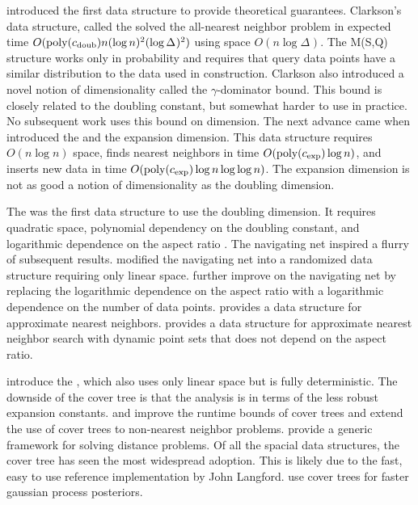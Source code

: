 \documentclass[thesis.tex]{subfiles}
\newcommand{\aspect}[1]{\Delta_{#1}}
\newcommand{\cexp}{c_\textnormal{exp}}
\newcommand{\cdoub}{c_\textnormal{doub}}
\newcommand{\poly}[1]{\text{poly}(#1)}
\begin{document}
\cite{clarkson1997nearest} introduced the first data structure to provide theoretical guarantees.
Clarkson's data structure, called the  solved the all-nearest neighbor problem in expected time $O(\poly{\cdoub}n(\log n)^2(\log \aspect{})^2)$ using space $O(n\log\aspect{})$.
The M(S,Q) structure works only in probability
and requires that query data points have a similar distribution to the data used in construction.
Clarkson also introduced a novel notion of dimensionality called the $\gamma$-dominator bound.
This bound is closely related to the doubling constant,
but somewhat harder to use in practice.
No subsequent work uses this bound on dimension.
The next advance came when \citet{karger2002finding} introduced the  and the expansion dimension. 
This data structure requires $O(n\log n)$ space, 
finds nearest neighbors in time $O(\poly\cexp\log n)$,
and inserts new data in time $O(\poly\cexp\log n \log \log n)$.
The expansion dimension is not as good a notion of dimensionality as the doubling dimension.

The  was the first data structure to use the doubling dimension.
It requires quadratic space, 
polynomial dependency on the doubling constant, 
and logarithmic dependence on the aspect ratio \citep{krauthgamer2004navigating}.
The navigating net inspired a flurry of subsequent results.
\citet{hildrum2004note} modified the navigating net into a randomized data structure requiring only linear space.
\cite{krauthgamer2005black} further improve on the navigating net by replacing the logarithmic dependence on the aspect ratio with a logarithmic dependence on the number of data points.
\cite{har2006fast} provides a data structure for approximate nearest neighbors.
\cite{cole2006searching} provides a data structure for approximate nearest neighbor search with dynamic point sets that does not depend on the aspect ratio.

\citet{beygelzimer2006cover} introduce the ,
which also uses only linear space but is fully deterministic.
The downside of the cover tree is that the analysis is in terms of the less robust expansion constants.
\cite{ram2009linear} and \cite{curtin2015plug} improve the runtime bounds of cover trees and extend the use of cover trees to non-nearest neighbor problems.
\cite{curtin2013tree} provide a generic framework for solving distance problems.
Of all the spacial data structures, 
the cover tree has seen the most widespread adoption.
This is likely due to the fast, easy to use reference implementation by John Langford.
\cite{moore2014fast} use cover trees for faster gaussian process posteriors.
\end{document}
